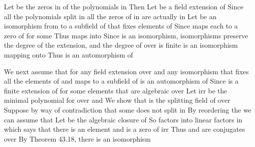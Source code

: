 \documentclass[11pt,oneside]{article}
\begin{document}
\begin{BookBody}
\noindent Let  be the zeros in  of the polynomials in  Then  Let  be a field extension of  Since all the polynomials  split in  all the zeros of  in  are actually in  Let \BookInline{\sigma } be an isomorphism from  to a subfield of  that fixes elements of  Since \BookInline{\sigma } maps each  to a zero of  for some  Thus \BookInline{\sigma } maps  into  Since \BookInline{\sigma } is an isomorphism, isomorphisms preserve the degree of the extension, and the degree of  over  is finite\BookInline{,\allowbreak \sigma } is an isomorphism mapping  onto  Thus \BookInline{\sigma } is an automorphism of 

We next assume that for any field extension  over  and any isomorphism \BookInline{\sigma } that fixes all the elements of  and maps  to a subfield of  is an automorphism of  Since  is a finite extension of  for some elements  that are algebraic over  Let  irr be the minimal polynomial for  over  and  We show that  is the splitting field of  over  Suppose by way of contradiction that some  does not split in  By reordering the  we can assume that  Let  be the algebraic closure of  So  factors into linear factors in  which says that there is an element  and \BookInline{\beta } is a zero of  irr Thus and \BookInline{\beta } are conjugates over  By Theorem 43.18, there is an isomorphism


\end{BookBody}
\end{document}

